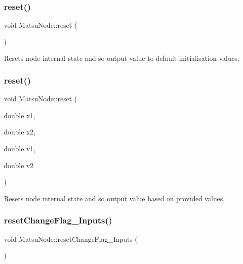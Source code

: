 \mbox{\label{classMatsuNode_a233ded2ac8a081385c56d52be06965b5}} 
\subsubsection{\texorpdfstring{reset()}{reset()}\hspace{0.1cm}{\footnotesize\ttfamily [1/2]}}
{\footnotesize\ttfamily void Matsu\+Node\+::reset (\begin{DoxyParamCaption}{ }\end{DoxyParamCaption})}



Resets node internal state and so output value to default initialisation values. 

\mbox{\label{classMatsuNode_a4649b0229d516bffa0129565b1805602}} 
\subsubsection{\texorpdfstring{reset()}{reset()}\hspace{0.1cm}{\footnotesize\ttfamily [2/2]}}
{\footnotesize\ttfamily void Matsu\+Node\+::reset (\begin{DoxyParamCaption}\item[{double}]{x1,  }\item[{double}]{x2,  }\item[{double}]{v1,  }\item[{double}]{v2 }\end{DoxyParamCaption})}



Resets node internal state and so output value based on provided values. 

\mbox{\label{classMatsuNode_a660a6945b92c6e50f8b17981f63ba6d4}} 
\subsubsection{\texorpdfstring{reset\+Change\+Flag\+\_\+\+Inputs()}{resetChangeFlag\_Inputs()}}
{\footnotesize\ttfamily void Matsu\+Node\+::reset\+Change\+Flag\+\_\+\+Inputs (\begin{DoxyParamCaption}{ }\end{DoxyParamCaption})}

